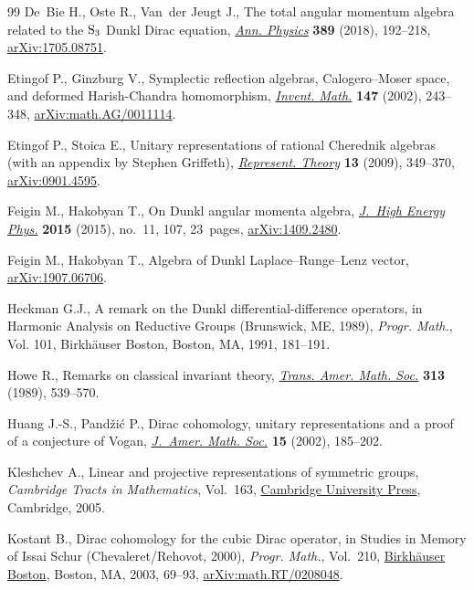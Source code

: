 \begin{thebibliography}{99}
De~Bie H., Oste R., Van~der Jeugt J., The total angular momentum algebra
 related to the {${\rm S}_3$} {D}unkl {D}irac equation, \href{https://doi.org/10.1016/j.aop.2017.12.015}{\textit{Ann. Physics}}
 \textbf{389} (2018), 192--218, \href{https://arxiv.org/abs/1705.08751}{arXiv:1705.08751}.

Etingof P., Ginzburg V., Symplectic reflection algebras, {C}alogero--{M}oser
 space, and deformed {H}arish-{C}handra homomorphism, \href{https://doi.org/10.1007/s002220100171}{\textit{Invent. Math.}}
 \textbf{147} (2002), 243--348, \href{https://arxiv.org/abs/math.AG/0011114}{arXiv:math.AG/0011114}.

Etingof P., Stoica E., Unitary representations of rational {C}herednik algebras
 (with an appendix by {S}tephen {G}riffeth), \href{https://doi.org/10.1090/S1088-4165-09-00356-2}{\textit{Represent. Theory}}
 \textbf{13} (2009), 349--370, \href{https://arxiv.org/abs/0901.4595}{arXiv:0901.4595}.

Feigin M., Hakobyan T., On {D}unkl angular momenta algebra, \href{https://doi.org/10.1007/JHEP11(2015)107}{\textit{J.~High
 Energy Phys.}} \textbf{2015} (2015), no.~11, 107, 23~pages,
 \href{https://arxiv.org/abs/1409.2480}{arXiv:1409.2480}.

Feigin M., Hakobyan T., Algebra of {D}unkl {L}aplace--{R}unge--{L}enz vector,
 \href{https://arxiv.org/abs/1907.06706}{arXiv:1907.06706}.

Heckman G.J., A remark on the {D}unkl differential-difference operators, in
 Harmonic Analysis on Reductive Groups ({B}runswick, {ME}, 1989),
 \textit{Progr. Math.}, Vol. 101, Birkh\"auser Boston, Boston, MA, 1991,
 181--191.

Howe R., Remarks on classical invariant theory, \href{https://doi.org/10.2307/2001418}{\textit{Trans. Amer. Math.
 Soc.}} \textbf{313} (1989), 539--570.

Huang J.-S., Pand\v{z}i\'c P., Dirac cohomology, unitary representations and a
 proof of a conjecture of {V}ogan, \href{https://doi.org/10.1090/S0894-0347-01-00383-6}{\textit{J.~Amer. Math. Soc.}} \textbf{15}
 (2002), 185--202.

Kleshchev A., Linear and projective representations of symmetric groups,
 \textit{Cambridge Tracts in Mathematics}, Vol.~163, \href{https://doi.org/10.1017/CBO9780511542800}{Cambridge University
 Press}, Cambridge, 2005.

Kostant B., Dirac cohomology for the cubic {D}irac operator, in Studies in
 Memory of {I}ssai {S}chur ({C}hevaleret/{R}ehovot, 2000), \textit{Progr.
 Math.}, Vol.~210, \href{https://doi.org/10.1007/978-1-4612-0045-1_4}{Birkh\"auser Boston}, Boston, MA, 2003, 69--93,
 \href{https://arxiv.org/abs/math.RT/0208048}{arXiv:math.RT/0208048}.


\end{thebibliography}

